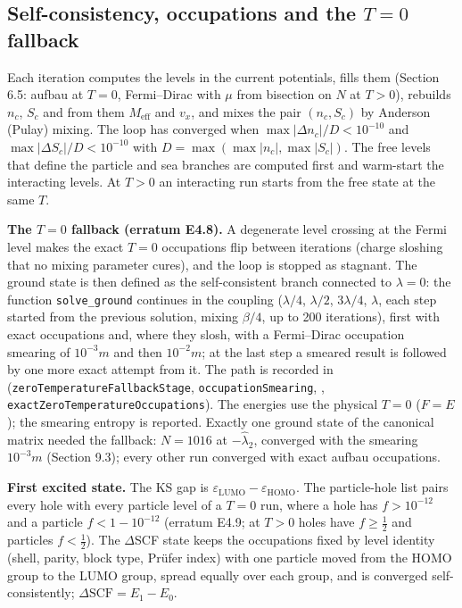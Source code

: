 \documentclass[11pt]{article}
\begin{document}
\subsection{Self-consistency, occupations and the \texorpdfstring{$T=0$}{T=0} fallback}

Each iteration computes the levels in the current potentials, fills them (Section 6.5: aufbau at $T=0$, Fermi--Dirac with $\mu$ from bisection on $N$ at $T>0$), rebuilds $n_c$, $S_c$ and from them $M_{\mathrm{eff}}$ and $v_x$, and mixes the pair $(n_c,S_c)$ by Anderson (Pulay) mixing. The loop has converged when $\max|\Delta n_c|/D<10^{-10}$ and $\max|\Delta S_c|/D<10^{-10}$ with $D=\max(\max|n_c|,\max|S_c|)$. The free levels that define the particle and sea branches are computed first and warm-start the interacting levels. At $T>0$ an interacting run starts from the free state at the same $T$.

\textbf{The $T=0$ fallback (erratum E4.8).} A degenerate level crossing at the Fermi level makes the exact $T=0$ occupations flip between iterations (charge sloshing that no mixing parameter cures), and the loop is stopped as stagnant. The ground state is then defined as the self-consistent branch connected to $\lambda=0$: the function \texttt{solve\_gr\allowbreak{}ound} continues in the coupling ($\lambda/4$, $\lambda/2$, $3\lambda/4$, $\lambda$, each step started from the previous solution, mixing $\beta/4$, up to 200 iterations), first with exact occupations and, where they slosh, with a Fermi--Dirac occupation smearing of $10^{-3}m$ and then $10^{-2}m$; at the last step a smeared result is followed by one more exact attempt from it. The path is recorded in \texttt{} (\texttt{zeroTemp\allowbreak{}eratureF\allowbreak{}allbackS\allowbreak{}tage}, \texttt{occupati\allowbreak{}onSmeari\allowbreak{}ng}, \texttt{}, \texttt{exactZer\allowbreak{}oTempera\allowbreak{}tureOccu\allowbreak{}pations}). The energies use the physical $T=0$ ($F=E$); the smearing entropy is reported. Exactly one ground state of the canonical matrix needed the fallback: $N=1016$ at $-\hat\lambda_2$, converged with the smearing $10^{-3}m$ (Section 9.3); every other run converged with exact aufbau occupations.

\textbf{First excited state.} The KS gap is $\varepsilon_{\mathrm{LUMO}}-\varepsilon_{\mathrm{HOMO}}$. The particle-hole list pairs every hole with every particle level of a $T=0$ run, where a hole has $f>10^{-12}$ and a particle $f<1-10^{-12}$ (erratum E4.9; at $T>0$ holes have $f\ge\tfrac12$ and particles $f<\tfrac12$). The $\Delta$SCF state keeps the occupations fixed by level identity (shell, parity, block type, Prüfer index) with one particle moved from the HOMO group to the LUMO group, spread equally over each group, and is converged self-consistently; $\Delta\mathrm{SCF}=E_1-E_0$.
\end{document}
